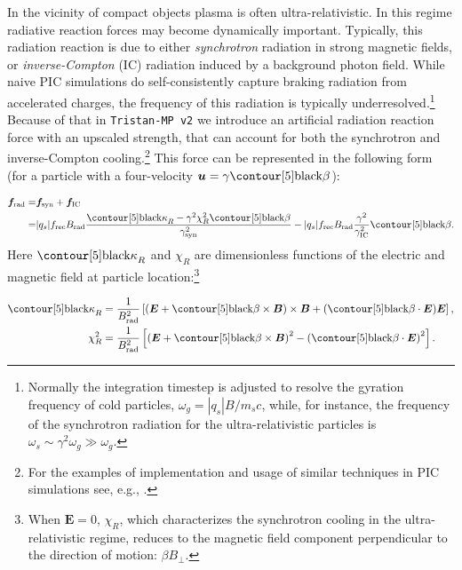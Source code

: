 In the vicinity of compact objects plasma is often ultra-relativistic. In this regime radiative reaction forces may become dynamically important. Typically, this radiation reaction is due to either \emph{synchrotron} radiation in strong magnetic fields, or \emph{inverse-Compton} (IC) radiation induced by a background photon field. While naive PIC simulations do self-consistently capture braking radiation from accelerated charges, the frequency of this radiation is typically underresolved.\footnote{Normally the integration timestep is adjusted to resolve the gyration frequency of cold particles, $\omega_g = |q_s|B / m_s c$, while, for instance, the frequency of the synchrotron radiation for the ultra-relativistic particles is $\omega_s \sim \gamma^2\omega_g\gg \omega_g$.} Because of that in \texttt{Tristan-MP v2} we introduce an artificial radiation reaction force with an upscaled strength, that can account for both the synchrotron and inverse-Compton cooling.\footnote{For the examples of implementation and usage of similar techniques in PIC simulations see, e.g., \cite{2010NJPh...12l3005T, 2016CoPhC.204..141V, 2016ApJ...828...92Y, 2019ApJ...877...53H, 2019MNRAS.482L..60W, 2020arXiv201203043N}.} This force can be represented in the following form (for a particle with a four-velocity $\bm{u}=\gamma\Vector{\beta}$): 

\begin{equation}
\begin{split}
\label{eq:num-radiation}
    \bm{f}_{\rm rad} =& \bm{f}_{\rm syn} + \bm{f}_{\rm IC}\\
    =&|q_s| f_{\rm rec} B_{\rm rad}\frac{\Vector{\kappa}_R - \gamma^2\chi_R^2 \Vector{\beta}}{\gamma_{\rm syn}^2}-|q_s| f_{\rm rec} B_{\rm rad}\frac{\gamma^2}{\gamma_{\rm IC}^2}\Vector{\beta}.
\end{split}
\end{equation}
\noindent Here $\Vector{\kappa}_R$ and $\chi_R$ are dimensionless functions of the electric and magnetic field at particle location:\footnote{When $\bm{E}=0$, $\chi_R$, which characterizes the synchrotron cooling in the ultra-relativistic regime, reduces to the magnetic field component perpendicular to the direction of motion: $\beta B_\perp$.}

\begin{equation}
    \begin{aligned}
    \label{eq:num-kappa-chi}
        \Vector{\kappa}_R &= \frac{1}{B_{\rm rad}^2}\left[\left(\bm{E} + \Vector{\beta}\times\bm{B}\right)\times\bm{B} + (\Vector{\beta}\cdot\bm{E})\bm{E}\right],\\
        \chi_R^2 &= \frac{1}{B_{\rm rad}^2}\left[\left(\bm{E} + \Vector{\beta}\times\bm{B}\right)^2 - \left(\Vector{\beta}\cdot\bm{E}\right)^2\right].
    \end{aligned}
\end{equation}

